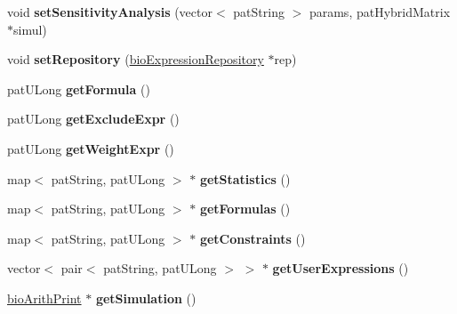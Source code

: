 \begin{DoxyCompactItemize}
\mbox{\label{classbio_model_a1e5a7162dbcb374404035ebd72d065e6}} 
void {\bfseries set\+Sensitivity\+Analysis} (vector$<$ pat\+String $>$ params, pat\+Hybrid\+Matrix $\ast$simul)
\item 
\mbox{\label{classbio_model_a74d6202ce8f69e83c31ccdfb2024d3e2}} 
void {\bfseries set\+Repository} (\hyperlink{classbio_expression_repository}{bio\+Expression\+Repository} $\ast$rep)
\item 
\mbox{\label{classbio_model_a2236d9ec638d1ee295ff241d16c78892}} 
pat\+U\+Long {\bfseries get\+Formula} ()
\item 
\mbox{\label{classbio_model_aca2925ffa4c535304c3f9ce350a049a4}} 
pat\+U\+Long {\bfseries get\+Exclude\+Expr} ()
\item 
\mbox{\label{classbio_model_a224ec795f752924a613ea073936bce0f}} 
pat\+U\+Long {\bfseries get\+Weight\+Expr} ()
\item 
\mbox{\label{classbio_model_a7414edb3f4ba702658a71d1e64414df9}} 
map$<$ pat\+String, pat\+U\+Long $>$ $\ast$ {\bfseries get\+Statistics} ()
\item 
\mbox{\label{classbio_model_a06b2a35c99d1ede3cd8df2a58cfe331a}} 
map$<$ pat\+String, pat\+U\+Long $>$ $\ast$ {\bfseries get\+Formulas} ()
\item 
\mbox{\label{classbio_model_a70242ba956b2335dbbc5055400aa92df}} 
map$<$ pat\+String, pat\+U\+Long $>$ $\ast$ {\bfseries get\+Constraints} ()
\item 
\mbox{\label{classbio_model_a0b4092c544b40eb4561e4de6e9e745c9}} 
vector$<$ pair$<$ pat\+String, pat\+U\+Long $>$ $>$ $\ast$ {\bfseries get\+User\+Expressions} ()
\item 
\mbox{\label{classbio_model_af5e2af441e1f646f2b2a5791262b7077}} 
\hyperlink{classbio_arith_print}{bio\+Arith\+Print} $\ast$ {\bfseries get\+Simulation} ()
\item 
\mbox{\label{classbio_model_a7d353e1f595224ee4d9720ef48abbc4f}} 

\end{DoxyCompactItemize}
